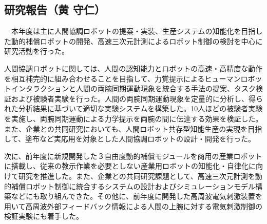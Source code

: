 \subsection{研究報告（黄 守仁）}

　本年度は主に人間協調ロボットの提案・実装、生産システムの知能化を目指した動的補償ロボットの開発、高速三次元計測によるロボット制御の検討を中心に研究活動を行った。

人間協調ロボットに関しては、人間の認知能力とロボットの高速・高精度な動作を相互補完的に組み合わせることを目指して、力覚提示によるヒューマンロボットインタラクションと人間の両腕同期運動現象を統合する手法の提案、タスク検証および被験者実験を行った。人間の両腕同期運動現象を定量的に分析し、得られた分析結果に基づいて適切な実験システムを構築した。10人ほどの被験者実験を実施し、両腕同期運動による力学提示を両腕の間に伝達する効果を検証した。また、企業との共同研究においても、人間ロボット共存型知能生産の実現を目指して、塗布など実応用を対象とした人間協調ロボットの設計・開発を行った。

次に、前年度に新規開発した３自由度動的補償モジュールを商用の産業ロボットに搭載し、従来の教示作業を必要としない産業用ロボットの知能化・自律化に向けて研究を推進した。また、企業との共同研究課題として、高速三次元計測を動的補償ロボット制御に統合するシステムの設計およびシミュレーションモデル構築などにも取り組んできた。その他に、前年度に開発した高周波電気刺激装置を用いて高周波外部フィードバック情報による人間の上腕に対する電気刺激制御の検証実験にも着手した。

